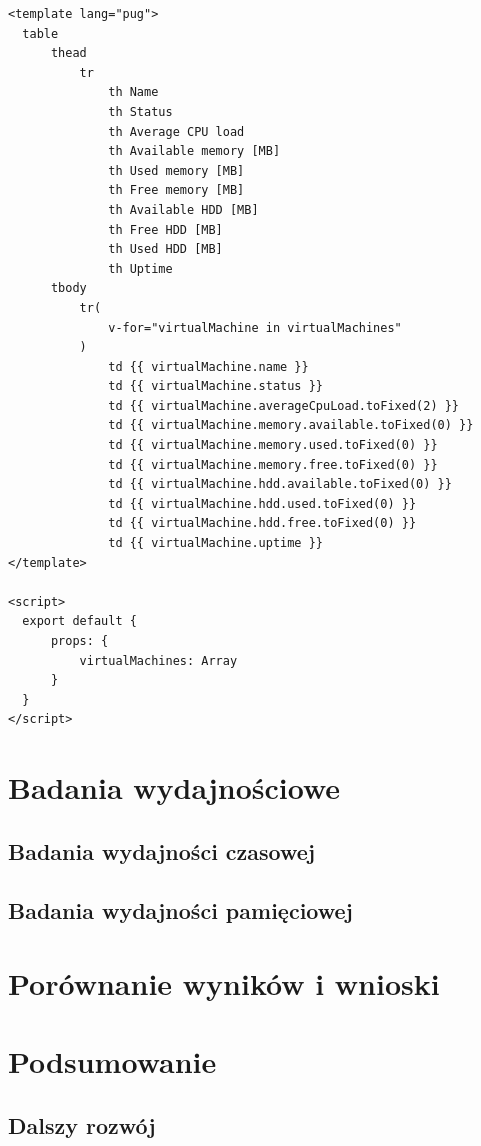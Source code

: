 \documentclass[polish, twoside, 12pt]{mwart}
\let\stdsection\section
\renewcommand*{\section}{\clearpage\stdsection}
\begin{document}
\begin{lstlisting}[caption=Komponent tabeli]
<template lang="pug">
  table
      thead
          tr
              th Name
              th Status
              th Average CPU load
              th Available memory [MB]
              th Used memory [MB]
              th Free memory [MB]
              th Available HDD [MB]
              th Free HDD [MB]
              th Used HDD [MB]
              th Uptime
      tbody
          tr(
              v-for="virtualMachine in virtualMachines"
          )
              td {{ virtualMachine.name }}
              td {{ virtualMachine.status }}
              td {{ virtualMachine.averageCpuLoad.toFixed(2) }}
              td {{ virtualMachine.memory.available.toFixed(0) }}
              td {{ virtualMachine.memory.used.toFixed(0) }}
              td {{ virtualMachine.memory.free.toFixed(0) }}
              td {{ virtualMachine.hdd.available.toFixed(0) }}
              td {{ virtualMachine.hdd.used.toFixed(0) }}
              td {{ virtualMachine.hdd.free.toFixed(0) }}
              td {{ virtualMachine.uptime }}
</template>

<script>
  export default {
      props: {
          virtualMachines: Array
      }
  }
</script>
\end{lstlisting}

\section{Badania wydajnościowe}

\subsection{Badania wydajności czasowej} 

\subsection{Badania wydajności pamięciowej}

\section{Porównanie wyników i wnioski}

\section{Podsumowanie}

\subsection{Dalszy rozwój}
\end{document}
